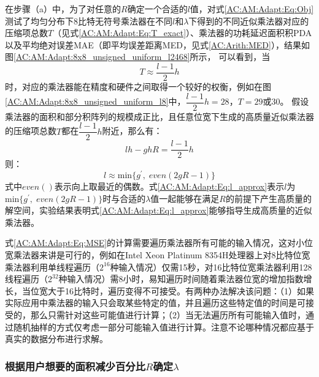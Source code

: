在步骤（a）中，为了对任意的$R$确定一个合适的$l$值，对式\eqref{AC:AM:Adapt:Eq:Obj}测试了均匀分布下8比特无符号乘法器在不同$l$和$\lambda$下得到的不同近似乘法器对应的压缩项总数$T$（见式\eqref{AC:AM:Adapt:Eq:T_exact}）、乘法器的功耗延迟面积积PDA以及平均绝对误差MAE（即平均误差距离MED，见式\eqref{AC:Arith:MED}），结果如图\ref{AC:AM:Adapt:8x8_unsigned_uniform_l2468}所示，
可以看到，当
\begin{equation}
    T \approx \frac{l-1}{2} h
\label{AC:AM:Adapt:Eq:T_approx}
\end{equation}
时，对应的乘法器能在精度和硬件之间取得一个较好的权衡，例如在图\ref{AC:AM:Adapt:8x8_unsigned_uniform_l8}中，$\dfrac{l-1}{2} h=28$，$T=29\text{或}30$。
假设乘法器的面积和部分积阵列的规模成正比，且任意位宽下生成的高质量近似乘法器的压缩项总数$T$都在$\dfrac{l-1}{2} h$附近，那么有：
\begin{equation}
    lh - ghR = \frac{l-1}{2} h
\end{equation}
则：
\begin{equation}
    l \approx \text{min} \{g^{\prime}, \; even ( 2gR-1 ) \}
\label{AC:AM:Adapt:Eq:l_approx}
\end{equation}
式中$even()$表示向上取最近的偶数。式\eqref{AC:AM:Adapt:Eq:l_approx}表示$l$为$\text{min} \{g^{\prime}, \; even ( 2gR-1 ) \}$时与合适的$\lambda$值一起能够在满足$R$的前提下产生高质量的解空间，实验结果表明式\eqref{AC:AM:Adapt:Eq:l_approx}能够指导生成高质量的近似乘法器。

式\eqref{AC:AM:Adapt:Eq:MSE}的计算需要遍历乘法器所有可能的输入情况，这对小位宽乘法器来讲是可行的，例如在Intel Xeon Platinum 8354H处理器上对8比特位宽乘法器利用单线程遍历（$2^{16}$种输入情况）仅需15秒，对16比特位宽乘法器利用128线程遍历（$2^{32}$种输入情况）需8小时，易知遍历时间随着乘法器位宽的增加指数增长，当位宽大于16比特时，遍历变得不可接受。有两种办法解决该问题：（1）如果实际应用中乘法器的输入只会取某些特定的值，并且遍历这些特定值的时间是可接受的，那么只需针对这些可能值进行计算；（2）当无法遍历所有可能输入值时，通过随机抽样的方式仅考虑一部分可能输入值进行计算。注意不论哪种情况都应基于真实的数据分布进行求解。

\subsubsection{根据用户想要的面积减少百分比$R$确定$\lambda$}

